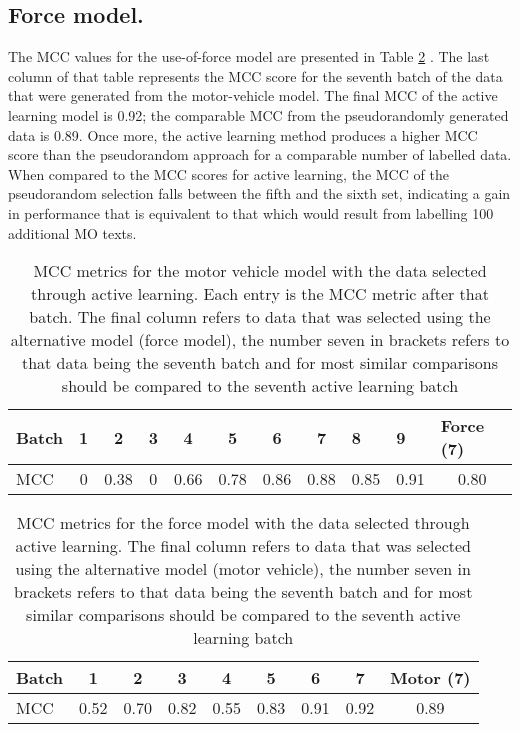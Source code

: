 \subsection{Force model.} The MCC values for the use-of-force model are presented in Table \ref{tab:active_results_force} . The last column of that table represents the MCC score for the seventh batch of the data that were generated from the motor-vehicle model. The final MCC of the active learning model is 0.92; the comparable MCC from the pseudorandomly generated data is 0.89. Once more, the active learning method produces a higher MCC score than the pseudorandom approach for a comparable number of labelled data. When compared to the MCC scores for active learning, the MCC of the pseudorandom selection falls between the fifth and the sixth set, indicating a gain in performance that is equivalent to that which would result from labelling 100 additional MO texts.




\begin{table}[]
\centering
\begin{tabular}{@{}lcccccccccc@{}}
\toprule
Batch  & 1 & 2    & 3 & 4    & 5    & 6    & 7    & \multicolumn{1}{l}{8} & \multicolumn{1}{l}{9} & \multicolumn{1}{l}{Force (7)} \\ \midrule
MCC    & 0 & 0.38 & 0 & 0.66 & 0.78 & 0.86 & 0.88 & 0.85                  & 0.91                  & 0.80                             \\ \midrule
\end{tabular}
\caption[MCC metrics. PF1 data. Car stolen model]{\label{tab:active_results_car} MCC metrics for the motor vehicle model with the data selected through active learning. Each entry is the MCC metric after that batch. The final column refers to data that was selected using the alternative model (force model), the number seven in brackets refers to that data being the seventh batch and for most similar comparisons should be compared to the seventh active learning batch}
\end{table}

\begin{table}[]
\centering
\begin{tabular}{@{}llllllllc@{}}
\toprule
Batch    & \multicolumn{1}{c}{1} & \multicolumn{1}{c}{2} & \multicolumn{1}{c}{3} & \multicolumn{1}{c}{4} & \multicolumn{1}{c}{5} & \multicolumn{1}{c}{6} & \multicolumn{1}{c}{7} & \multicolumn{1}{c}{Motor (7)} \\ \midrule
MCC    & 0.52                  & 0.70                  & 0.82                  & 0.55                  & 0.83                  & 0.91                  & 0.92   & 0.89                \\ \bottomrule
\end{tabular}
\caption[MCC metrics. PF1 data. force used model]{\label{tab:active_results_force} MCC metrics for the force model with the data selected through active learning. The final column refers to data that was selected using the alternative model (motor vehicle), the number seven in brackets refers to that data being the seventh batch and for most similar comparisons should be compared to the seventh  active learning batch}
\end{table}


